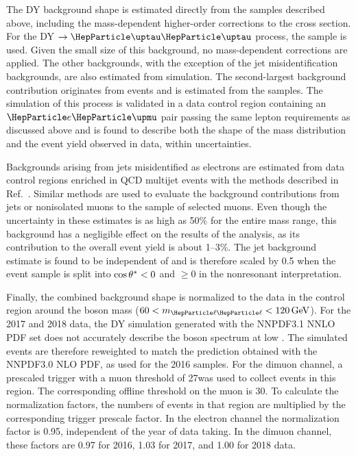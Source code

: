 \documentclass[11pt,twoside,a4paper,cmspaper,final,collab]{cms-tdr}
\begin{document}
The DY background shape is estimated directly from the \POWHEG samples described above, including the mass-dependent higher-order corrections to the cross section. For the DY $\to\Pgt\Pgt$ process, the \MGvATNLO sample is used. Given the small size of this background, no mass-dependent corrections are applied. The other backgrounds, with the exception of the jet misidentification backgrounds, are also estimated from simulation. The second-largest background contribution originates from \ttbar events and is estimated from the \POWHEG samples. The simulation of this process is validated in a data control region containing an $\Pe\PGm$ pair passing the same lepton requirements as discussed above and is found to describe both the shape of the mass distribution and the event yield observed in data, within uncertainties.

Backgrounds arising from jets misidentified as electrons are estimated from data control regions enriched in QCD multijet events with the methods described in Ref.~\cite{Khachatryan:2014fba}. Similar methods are used to evaluate the background contributions from jets or nonisolated muons to the sample of selected muons. Even though the uncertainty in these estimates is as high as 50\% for the entire mass range, this background has a negligible effect on the results of the analysis, as its contribution to the overall event yield is about 1--3\%. The jet background estimate is found to be independent of \costheta and is therefore scaled by 0.5 when the event sample is split into $\cos\theta^\ast < 0$ and $\geq$0 in the nonresonant interpretation.

Finally, the combined background shape is normalized to the data in the control region around the \PZ boson mass ($60 < \mll < 120\GeV$). For the 2017 and 2018 data, the DY simulation generated with the NNPDF3.1 NNLO PDF set does not accurately describe the \PZ boson \pt spectrum at low \pt. The simulated events are therefore reweighted to match the prediction obtained with the NNPDF3.0 NLO PDF, as used for the 2016 samples. For the dimuon channel, a prescaled trigger with a muon \pt threshold of 27\GeV was used to collect events in this region. The corresponding offline threshold on the muon \pt is 30\GeV. To calculate the normalization factors, the numbers of events in that region are multiplied by the corresponding trigger prescale factor. In the electron channel the normalization factor is 0.95, independent of the year of data taking. In the dimuon channel, these factors are 0.97 for 2016, 1.03 for 2017, and 1.00 for 2018 data.
\end{document}
